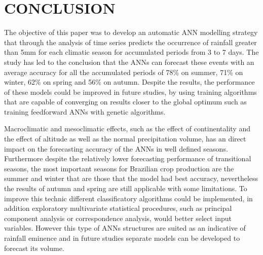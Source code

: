 \chapter{CONCLUSION}
\label{cap:cap4}
\vspace{-2cm}

The objective of this paper was to develop an automatic ANN modelling strategy that through the analysis of time series predicts the occurrence of rainfall greater than 5mm for each climatic season for accumulated periods from 3 to 7 days. The study has led to the conclusion that the ANNs can forecast these events with an average accuracy for all the accumulated periods of 78\%  on summer,  71\% on winter, 62\% on spring  and 56\% on autumn. Despite the results, the performance of these models could be improved in future studies, by using training algorithms that are capable of converging on results closer to the global optimum such as training feedforward ANNs with genetic algorithms.

Macroclimatic and mesoclimatic effects, such as the effect of continentality and the effect of altitude as well as the normal precipitation volume, has an direct impact on the forecasting accuracy of the ANNs in well defined seasons. Furthermore despite the relatively lower forecasting performance of transitional seasons, the most important seasons for Brazilian crop production are the summer and winter that are those that the model had best accuracy, nevertheless the results of autumn and spring are still applicable with some limitations. To improve this technic different classificatory algorithms could be implemented, in addition exploratory multivariate statistical procedures, such as principal component analysis or correspondence analysis, would better select input variables. However this type of ANNs structures are suited as an indicative of rainfall eminence and in future studies separate models can be developed to forecast its volume.

